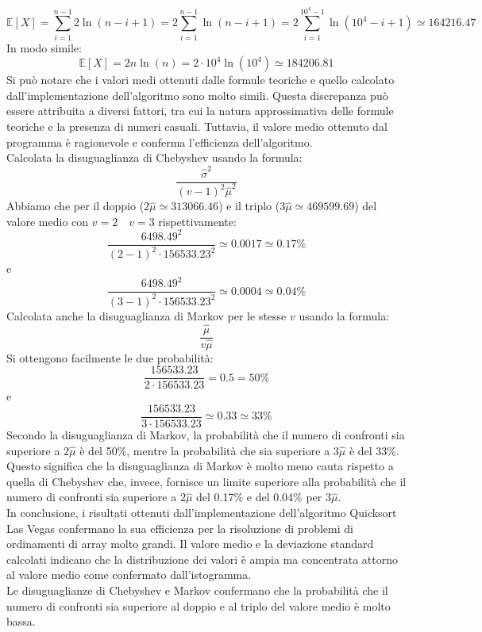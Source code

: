 \documentclass[12pt]{article}
\begin{document}
\begin{equation*}
    \mathbb{E}[X] = \sum_{i=1}^{n-1}2\ln(n-i+1) = 2\sum_{i=1}^{n-1}\ln(n-i+1)
    = 2\sum_{i=1}^{10^{4}-1}\ln(10^{4}-i+1) \simeq 164216.47
\end{equation*}
In modo simile:
\begin{equation*}
    \mathbb{E}[X]=2n\ln(n) = 2\cdot 10^{4}\ln(10^{4}) \simeq 184206.81
\end{equation*}
Si può notare che i valori medi ottenuti dalle formule teoriche e quello
calcolato dall'implementazione dell'algoritmo sono molto simili.
Questa discrepanza può essere attribuita a diversi fattori, tra cui la natura
approssimativa delle formule teoriche e la presenza di numeri casuali. Tuttavia,
il valore medio ottenuto dal programma è ragionevole e conferma l'efficienza
dell'algoritmo.\\
Calcolata la disuguaglianza di Chebyshev usando la formula:
\begin{equation*}
    \frac{\hat{\sigma}^{2}}{(v-1)^{2}\hat{\mu}^{2}}
\end{equation*}
Abbiamo che  per il 
doppio ($2\hat{\mu}\simeq 313066.46$) e il triplo 
($3\hat{\mu} \simeq 469599.69$) del valore medio con 
$v=2 \quad v=3$ rispettivamente:
\begin{equation*}
    \frac{6498.49^{2}}{(2-1)^{2}\cdot 156533.23^{2}} \simeq 0.0017 
    \simeq 0.17\%
\end{equation*}
e
\begin{equation*}
    \frac{6498.49^{2}}{(3-1)^{2}\cdot 156533.23^{2}} \simeq 0.0004 
    \simeq 0.04\%
\end{equation*}
Calcolata anche la disuguaglianza di Markov per le stesse $v$ usando la formula:
\begin{equation*}
    \frac{\hat{\mu}}{v\hat{\mu}}
\end{equation*}
Si ottengono facilmente le due probabilità:
\begin{equation*}
    \frac{156533.23}{2\cdot 156533.23} = 0.5 = 50\%
\end{equation*}
e
\begin{equation*}
    \frac{156533.23}{3\cdot 156533.23} \simeq 0.33 \simeq 33\%
\end{equation*}
Secondo la disuguaglianza di Markov, la probabilità che il numero di confronti
sia superiore a $2\hat{\mu}$ è del 50\%, mentre la probabilità che sia
superiore a $3\hat{\mu}$ è del 33\%. Questo significa che la disuguaglianza
di Markov è molto meno cauta rispetto a quella di Chebyshev che, invece, 
fornisce un limite superiore alla probabilità che il numero di confronti
sia superiore a $2\hat{\mu}$ del 0.17\% e del 0.04\% per $3\hat{\mu}$.\\
In conclusione, i risultati ottenuti dall'implementazione dell'algoritmo 
Quicksort Las Vegas confermano la sua efficienza per la risoluzione di
problemi di ordinamenti di array molto grandi. Il valore medio e la 
deviazione standard calcolati indicano che la distribuzione dei valori
è ampia ma concentrata attorno al valore medio come confermato dall'istogramma.\\
Le disuguaglianze di Chebyshev e Markov confermano che la probabilità
che il numero di confronti sia superiore al doppio e al triplo del valore 
medio è molto bassa.
\end{document}

